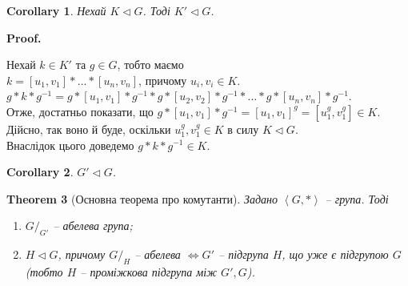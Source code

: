 \documentclass[a4paper, 10pt]{article}
\makeatletter
\theoremstyle{theoremdd}
\newtheorem{theorem}{Theorem}[subsection]
\theoremstyle{theoremdd}
\theoremstyle{theoremdd}
\theoremstyle{theoremdd}
\theoremstyle{theoremdd}
\theoremstyle{theoremdd}
\theoremstyle{theoremdd}
\theoremstyle{theoremdd}
\theoremstyle{theoremdd}
\theoremstyle{theoremdd}
\theoremstyle{theoremdd}
\theoremstyle{theoremdd}
\theoremstyle{theoremdd}
\theoremstyle{theoremdd}
\newtheorem{corollary}[theorem]{Corollary}
\theoremstyle{theoremdd}
\renewenvironment{proof}[1][Proof.\\]{\par
\pushQED{\hfill \qed}%
\normalfont \topsep6\p@\@plus6\p@\relax
\trivlist
\item\relax
{\bfseries
#1\@addpunct{.}}\hspace\labelsep\ignorespaces
}{%
\popQED\endtrivlist\@endpefalse
}
\makeatother
\begin{document}
\begin{corollary}
Нехай $K \triangleleft G$. Тоді $K' \triangleleft G$.
\end{corollary}

\begin{proof}
Нехай $k \in K'$ та $g \in G$, тобто маємо\\
$k = [u_1,v_1]* \dots *[u_n,v_n]$, причому $u_i,v_i \in K$.\\
$g*k*g^{-1} = g*[u_1,v_1]*g^{-1}*g*[u_2,v_2]*g^{-1}*\dots*g*[u_n,v_n]*g^{-1}$.\\
Отже, достатньо показати, що $g*[u_1,v_1]*g^{-1} = [u_1,v_1]^g = [u_1^g,v_1^g] \in K$. Дійсно, так воно й буде, оскільки $u_1^g,v_1^g \in K$ в силу $K \triangleleft G$.\\
Внаслідок цього доведемо $g*k*g^{-1} \in K$.
\end{proof}

\begin{corollary}
$G' \triangleleft G$.
\end{corollary}

\begin{theorem}[Основна теорема про комутанти]
Задано $\left<G,*\right>$ -- група. Тоді
\begin{enumerate}[nosep,wide=0pt,label={\arabic*)}]
\item $G/_{G'}$ -- абелева група;
\item $H \triangleleft G$, причому $G/_H$ -- абелева $\iff G'$ -- підгрупа $H$, що уже є підгрупою $G$ (тобто $H$ -- проміжкова підгрупа між $G',G$).
\end{enumerate}
\end{theorem}
\end{document}

